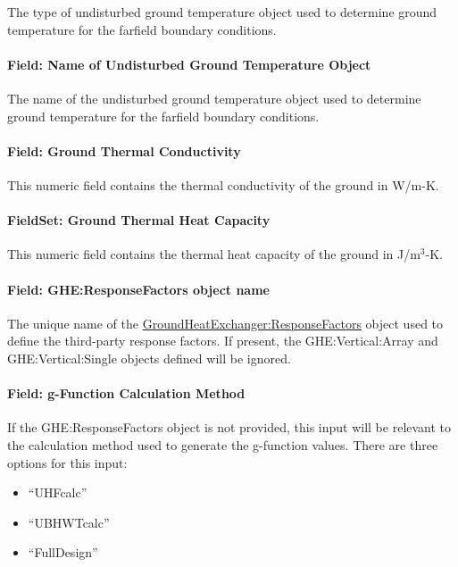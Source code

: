 The type of undisturbed ground temperature object used to determine ground temperature for the farfield boundary conditions.

\paragraph{Field: Name of Undisturbed Ground Temperature Object}\label{field-name-of-undisturbed-ground-temperature-object}

The name of the undisturbed ground temperature object used to determine ground temperature for the farfield boundary conditions.

\paragraph{Field: Ground Thermal Conductivity}\label{field-ground-thermal-conductivity}

This numeric field contains the thermal conductivity of the ground in W/m-K.

\paragraph{FieldSet: Ground Thermal Heat Capacity}\label{fieldset-ground-thermal-heat-capacity}

This numeric field contains the thermal heat capacity of the ground in J/m\(^{3}\)-K.

\paragraph{Field: GHE:ResponseFactors object name}

The unique name of the \hyperref[groundheatexchangerresponsefactors]{GroundHeatExchanger:ResponseFactors} object used to define the third-party response factors. If present, the GHE:Vertical:Array and GHE:Vertical:Single objects defined will be ignored.

\paragraph{Field: g-Function Calculation Method}

If the GHE:ResponseFactors object is not provided, this input will be relevant to the calculation method used to generate the g-function values.
There are three options for this input:

\begin{itemize}
  \item ``UHFcalc''
  \item ``UBHWTcalc''
  \item ``FullDesign''
\end{itemize}


